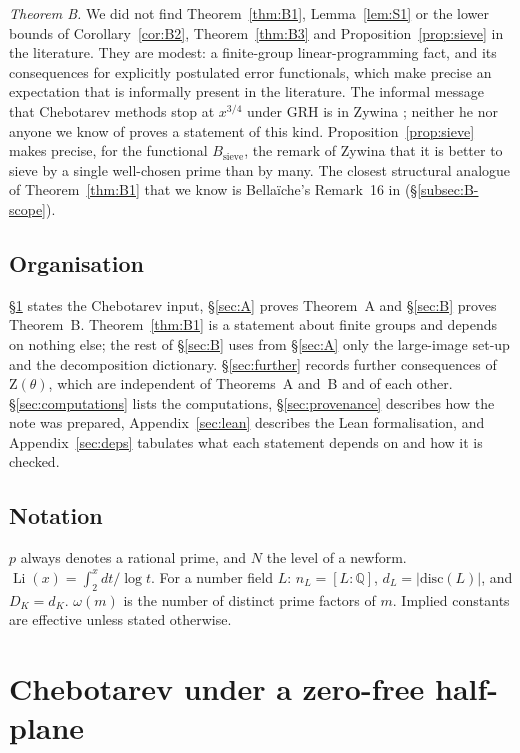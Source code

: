 \documentclass[11pt]{amsart}
\theoremstyle{definition}
\theoremstyle{remark}
\newcommand{\Q}{\mathbb{Q}}
\DeclareMathOperator{\Li}{Li}
\newcommand{\Zt}{\mathrm{Z}}       %
\begin{document}
\emph{Theorem B.} We did not find Theorem~\ref{thm:B1}, Lemma~\ref{lem:S1} or the lower bounds of
Corollary~\ref{cor:B2}, Theorem~\ref{thm:B3} and Proposition~\ref{prop:sieve} in the literature. They are modest: a
finite-group linear-programming fact, and its consequences for explicitly postulated error functionals, which make
precise an expectation that is informally present in the literature. The informal message that Chebotarev methods stop
at $x^{3/4}$ under GRH is in Zywina \cite[\S1.3]{Zyw15}; neither he nor anyone we know of proves a statement of this
kind. Proposition~\ref{prop:sieve} makes precise, for the functional $B_{\mathrm{sieve}}$, the remark of Zywina
\cite[Rem.~1.7(iii)]{Zyw08} that it is better to sieve by a single well-chosen prime than by many. The closest
structural analogue of Theorem~\ref{thm:B1} that we know is Bella\"iche's Remark~16 in \cite{Bel16}
(\S\ref{subsec:B-scope}).

\subsection{Organisation}\label{subsec:organisation}
\S\ref{sec:cheb} states the Chebotarev input, \S\ref{sec:A} proves Theorem~A and \S\ref{sec:B} proves Theorem~B.
Theorem~\ref{thm:B1} is a statement about finite groups and depends on nothing else; the rest of \S\ref{sec:B} uses
from \S\ref{sec:A} only the large-image set-up and the decomposition dictionary. \S\ref{sec:further} records further
consequences of $\Zt(\theta)$, which are independent of Theorems~A and~B and of each other. \S\ref{sec:computations}
lists the computations, \S\ref{sec:provenance} describes how the note was prepared, Appendix~\ref{sec:lean}
describes the Lean formalisation, and Appendix~\ref{sec:deps} tabulates what each statement depends on and how it is
checked.

\subsection*{Notation}
$p$ always denotes a rational prime, and $N$ the level of a newform. $\Li(x)=\int_2^x dt/\log t$. For a number field $L$:
$n_L=[L:\Q]$, $d_L=|\mathrm{disc}(L)|$, and $D_K=d_K$. $\omega(m)$ is the number of distinct prime factors of $m$.
Implied constants are effective unless stated otherwise.

\section{Chebotarev under a zero-free half-plane}\label{sec:cheb}
\end{document}
